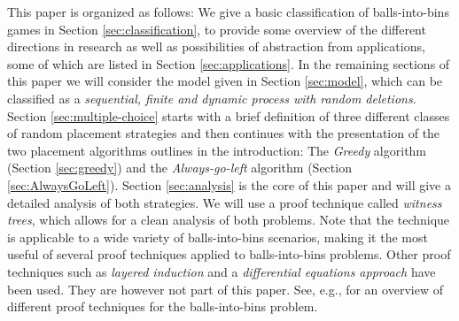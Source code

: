 \documentclass[a4paper,12pt]{article}
\begin{document}
This paper is organized as follows: We give a basic classification of balls-into-bins games in Section \ref{sec:classification}, to provide some overview of the different directions in research as well as possibilities of abstraction from applications, some of which are listed in Section \ref{sec:applications}. In the remaining sections of this paper we will consider the model given in Section \ref{sec:model}, which can be classified as a \emph{sequential, finite and dynamic process with random deletions}. Section \ref{sec:multiple-choice} starts with a brief definition of three different classes of random placement strategies and then continues with the presentation of the two placement algorithms outlines in the introduction: The  \emph{Greedy} algorithm (Section \ref{sec:greedy}) and the \emph{Always-go-left} algorithm (Section \ref{sec:AlwaysGoLeft}). Section \ref{sec:analysis} is the core of this paper and will give a detailed analysis of both strategies. We will use a proof technique called \emph{witness trees}, which allows for a clean analysis of both problems. Note that the technique is applicable to a wide variety of balls-into-bins scenarios, making it the most useful of several proof techniques applied to balls-into-bins problems. Other proof techniques such as \emph{layered induction} and a \emph{differential equations approach} have been used. They are however not part of this paper. See, e.g., \cite{MRS01} for an overview of different proof techniques for the balls-into-bins problem.

\begin{comment}
In Section \ref{sec:strategies}, we will provide asymptotic bounds for the ad dative gap of this strategy, which we will then use to devise more complex strategies that significantly reduce these bounds. 
\end{comment}

\begin{comment}
These result may sometimes seem surprising, which is why we will denote a significant part of this article to demonstrate proofs in detail. This proof technique may be useful for devising asymptotic bounds for the additive gap of different balls-into-bins scenarios and strategies.
\end{comment}
\end{document}
